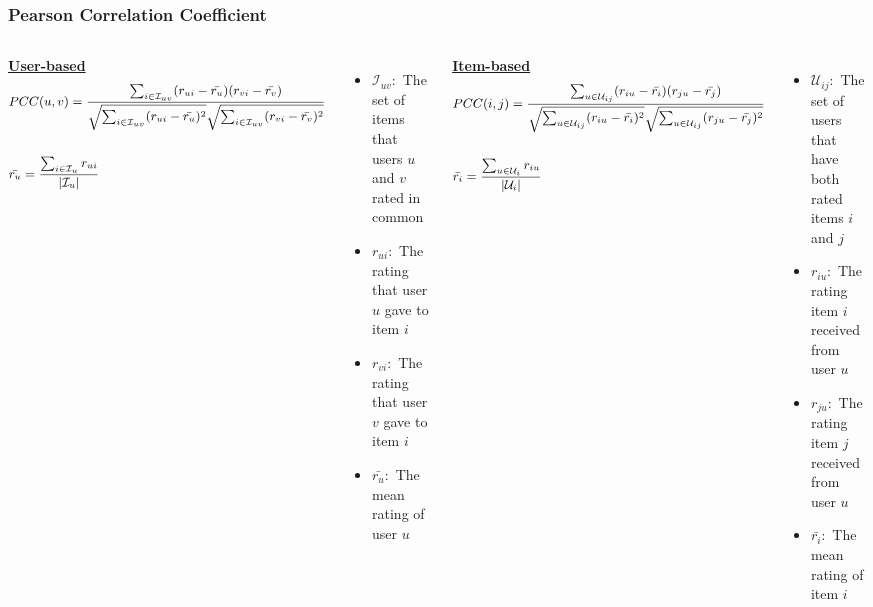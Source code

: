 \begin{frame}
    \frametitle{Pearson Correlation Coefficient}
    \vspace{-0.8cm}
    \begin{columns}
        \hspace{-7mm}
        \centering
        \underline{\textbf{User-based}}
        \begin{equation*}
            \small
            \begin{split}
            &PCC(u,v) = \frac{\sum_{i \in \mathcal{I}_{uv}}(r_{ui}-\bar{r_{u}})(r_{vi}-\bar{r_{v}})}
                             {\sqrt{\sum_{i \in \mathcal{I}_{uv}}(r_{ui}-\bar{r_{u}})^2}
                              \sqrt{\sum_{i \in \mathcal{I}_{uv}}(r_{vi}-\bar{r_{v}})^2}} \\\\
            &\bar{r_{u}} = \frac{\sum_{i \in \mathcal{I}_u}r_{ui}}
                                {\mathopen|\mathcal{I}_u\mathclose|}
        \end{split}
        \end{equation*}
        \tiny
        \begin{itemize}
            \item $\mathcal{I}_{uv}:$ The set of items that users $u$ and $v$ rated in common
            \item $r_{ui}:$ The rating that user $u$ gave to item $i$
            \item $r_{vi}:$ The rating that user $v$ gave to item $i$
            \item $\bar{r_{u}}:$ The mean rating of user $u$

        \end{itemize}
        \centering
        \underline{\textbf{Item-based}}
        \begin{equation*}
            \small
            \begin{split}
            &PCC(i,j) = \frac{\sum_{u \in \mathcal{U}_{ij}}(r_{iu}-\bar{r_{i}})(r_{ju}-\bar{r_{j}})}
                             {\sqrt{\sum_{u \in \mathcal{U}_{ij}}(r_{iu}-\bar{r_{i}})^2}
                              \sqrt{\sum_{u \in \mathcal{U}_{ij}}(r_{ju}-\bar{r_{j}})^2}} \\\\
            &\bar{r_{i}} = \frac{\sum_{u \in \mathcal{U}_i}r_{iu}}
                                {\mathopen|\mathcal{U}_i\mathclose|}
        \end{split}
        \end{equation*}
        \tiny
        \begin{itemize}
            \item $\mathcal{U}_{ij}:$ The set of users that have both rated items $i$ and $j$
            \item $r_{iu}:$ The rating item $i$ received from user $u$
            \item $r_{ju}:$ The rating item $j$ received from user $u$
            \item $\bar{r_{i}}:$ The mean rating of item $i$


\end{itemize}
\end{columns}
\end{frame}
